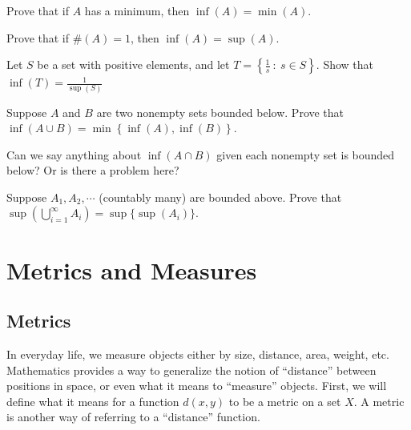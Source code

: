 \begin{exercise}
    Prove that if $A$ has a minimum, then $\inf(A)=\min(A)$.
\end{exercise}
    \vspace{-4mm}
\begin{exercise}
    Prove that if $\#(A)=1$, then $\inf(A)=\sup(A)$.
\end{exercise}
    \vspace{-4mm}
\begin{exercise}
    Let $S$ be a set with positive elements, and let $T=\left\{\frac{1}{s}\ :\ s\in S\right\}$. Show that $\inf(T)=\frac{1}{\sup(S)}$ 
\end{exercise}
    \vspace{-4mm}
\begin{exercise}
    Suppose $A$ and $B$ are two nonempty sets bounded below. Prove that $\inf(A\cup B)=\min\left\{\inf(A),\inf(B)\right\}$.
\end{exercise}
    \vspace{-4mm}
\begin{exercise}
    Can we say anything about $\inf(A\cap B)$ given each nonempty set is bounded below? Or is there a problem here?
\end{exercise}
    \vspace{-4mm}
\begin{exercise}[Challenge]
    Suppose $A_1,A_2,\cdots$ (countably many) are bounded above. Prove that $\sup(\bigcup_{i=1}^\infty A_i)=\sup\{\sup(A_i)\}$.
\end{exercise}



\clearpage

\section{Metrics and Measures}

\subsection{Metrics}


In everyday life, we measure objects either by size, distance, area, weight, etc. Mathematics provides a way to generalize the notion of ``distance'' between positions in space, or even what it means to ``measure'' objects. First, we will define what it means for a function $d(x,y)$ to be a metric on a set $X$. A metric is another way of referring to a ``distance'' function.\\

